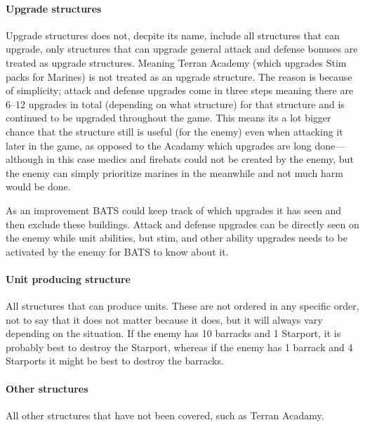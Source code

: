 \paragraph{Upgrade structures \attackCoordinatorWeightsUpgradeStructure}
Upgrade structures does not, decpite its name, include all structures that can upgrade, only structures that can upgrade general attack and defense bonuses are treated as upgrade structures. Meaning Terran Academy (which upgrades Stim packs for Marines) is not treated as an upgrade structure. The reason is because of simplicity; attack and defense upgrades come in three steps meaning there are 6–12 upgrades in total (depending on what structure) for that structure and is continued to be upgraded throughout the game. This means its a lot bigger chance that the structure still is useful (for the enemy) even when attacking it later in the game, as opposed to the Acadamy which upgrades are long done—although in this case medics and firebats could not be created by the enemy, but the enemy can simply prioritize marines in the meanwhile and not much harm would be done.

As an improvement BATS could keep track of which upgrades it has seen and then exclude these buildings. Attack and defense upgrades can be directly seen on the enemy while unit abilities, but stim, and other ability upgrades needs to be activated by the enemy for BATS to know about it.

\paragraph{Unit producing structure \attackCoordinatorWeightsUnitProducingStructure}
All structures that can produce units. These are not ordered in any specific order, not to say that it does not matter because it does, but it will always vary depending on the situation. If the enemy has 10 barracks and 1 Starport, it is probably best to destroy the Starport, whereas if the enemy has 1 barrack and 4 Starports it might be best to destroy the barracks.

\paragraph{Other structures \attackCoordinatorWeightsOtherStructure}
All other structures that have not been covered, such as Terran Acadamy.

